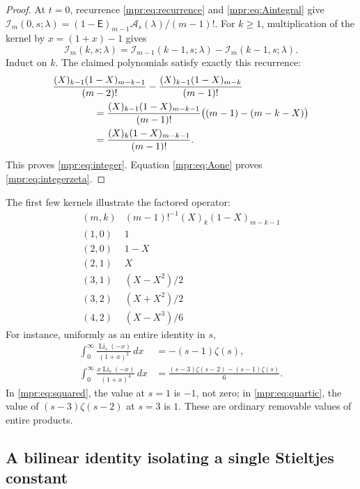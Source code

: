 \documentclass[11pt,letterpaper]{article}
\numberwithin{equation}{section}
\theoremstyle{definition}
\theoremstyle{remark}
\begin{document}
\begin{proof}
At $t=0$, recurrence \eqref{mpr:eq:recurrence} and
\eqref{mpr:eq:Aintegral} give
$\mathcal I_m(0,s;\lambda)
=(1-\mathsf E)_{m-1}\mathcal A_s(\lambda)/(m-1)!$.
For $k\ge1$, multiplication of the kernel by
$x=(1+x)-1$ gives
\[
 \mathcal I_m(k,s;\lambda)
  =\mathcal I_{m-1}(k-1,s;\lambda)
                -\mathcal I_m(k-1,s;\lambda).
\]
Induct on $k$.  The claimed polynomials satisfy exactly this recurrence:
\begin{align*}
 &\frac{(X)_{k-1}(1-X)_{m-k-1}}{(m-2)!}
  -\frac{(X)_{k-1}(1-X)_{m-k}}{(m-1)!}\\
 &\hspace{15mm}
 =\frac{(X)_{k-1}(1-X)_{m-k-1}}{(m-1)!}
                   \bigl((m-1)-(m-k-X)\bigr)\\
 &\hspace{15mm}
 =\frac{(X)_k(1-X)_{m-k-1}}{(m-1)!}.
\end{align*}
This proves \eqref{mpr:eq:integer}.  Equation
\eqref{mpr:eq:Aone} proves \eqref{mpr:eq:integerzeta}.
\end{proof}

The first few kernels illustrate the factored operator:
\[
\begin{array}{c|c}
 (m,k)&(m-1)!^{-1}(X)_k(1-X)_{m-k-1}\\ \hline
 (1,0)&1\\
 (2,0)&1-X\\
 (2,1)&X\\
 (3,1)&(X-X^2)/2\\
 (3,2)&(X+X^2)/2\\
 (4,2)&(X-X^3)/6
\end{array}
\]
For instance, uniformly as an entire identity in $s$,
\begin{align}
 \int_0^\infty\frac{\operatorname{Li}_s(-x)}{(1+x)^2}\,dx
       &=-(s-1)\zeta(s),\label{mpr:eq:squared}\\
 \int_0^\infty\frac{x\operatorname{Li}_s(-x)}{(1+x)^4}\,dx
       &=\frac{(s-3)\zeta(s-2)-(s-1)\zeta(s)}6.
       \label{mpr:eq:quartic}
\end{align}
In \eqref{mpr:eq:squared}, the value at $s=1$ is $-1$, not zero;
in \eqref{mpr:eq:quartic}, the value of $(s-3)\zeta(s-2)$ at $s=3$
is $1$.  These are ordinary removable values of entire products.

\subsection{A bilinear identity isolating a single Stieltjes constant}
\end{document}
